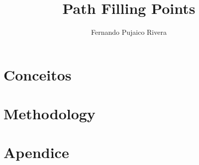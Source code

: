 \documentclass{book}
\title{Path Filling Points}
\author{Fernando Pujaico Rivera}
\begin{document}
\maketitle 

\tableofcontents



\chapter{Conceitos}


\chapter{Methodology}



\chapter{Apendice}



\printbibliography
\end{document}
